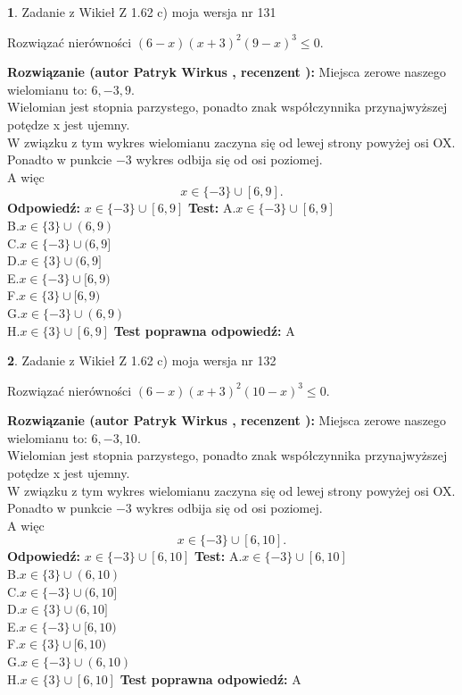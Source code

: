 \documentclass[12pt, a4paper]{article}
\theoremstyle{definition} %
\newtheorem{zad}{}
\newcommand{\zadStart}[1]{\begin{zad}#1\newline}
\newcommand{\zadStop}{\end{zad}}
\newcommand{\rozwStart}[2]{\noindent \textbf{Rozwiązanie (autor #1 , recenzent #2): }\newline}
\newcommand{\rozwStop}{\newline}
\newcommand{\odpStart}{\noindent \textbf{Odpowiedź:}\newline}
\newcommand{\odpStop}{\newline}
\newcommand{\testStart}{\noindent \textbf{Test:}\newline}
\newcommand{\testStop}{\newline}
\newcommand{\kluczStart}{\noindent \textbf{Test poprawna odpowiedź:}\newline}
\newcommand{\kluczStop}{\newline}
\begin{document}
\zadStart{Zadanie z Wikieł Z 1.62 c) moja wersja nr 131}

Rozwiązać nierówności $(6-x)(x+3)^{2}(9-x)^{3}\le0$.
\zadStop
\rozwStart{Patryk Wirkus}{}
Miejsca zerowe naszego wielomianu to: $6, -3, 9$.\\
Wielomian jest stopnia parzystego, ponadto znak współczynnika przy\linebreak najwyższej potędze x jest ujemny.\\ W związku z tym wykres wielomianu zaczyna się od lewej strony powyżej osi OX.\\
Ponadto w punkcie $-3$ wykres odbija się od osi poziomej.\\
A więc $$x \in \{-3\} \cup [6,9].$$
\rozwStop
\odpStart
$x \in \{-3\} \cup [6,9]$
\odpStop
\testStart
A.$x \in \{-3\} \cup [6,9]$\\
B.$x \in \{3\} \cup (6,9)$\\
C.$x \in \{-3\} \cup (6,9]$\\
D.$x \in \{3\} \cup (6,9]$\\
E.$x \in \{-3\} \cup [6,9)$\\
F.$x \in \{3\} \cup [6,9)$\\
G.$x \in \{-3\} \cup (6,9)$\\
H.$x \in \{3\} \cup [6,9]$
\testStop
\kluczStart
A
\kluczStop



\zadStart{Zadanie z Wikieł Z 1.62 c) moja wersja nr 132}

Rozwiązać nierówności $(6-x)(x+3)^{2}(10-x)^{3}\le0$.
\zadStop
\rozwStart{Patryk Wirkus}{}
Miejsca zerowe naszego wielomianu to: $6, -3, 10$.\\
Wielomian jest stopnia parzystego, ponadto znak współczynnika przy\linebreak najwyższej potędze x jest ujemny.\\ W związku z tym wykres wielomianu zaczyna się od lewej strony powyżej osi OX.\\
Ponadto w punkcie $-3$ wykres odbija się od osi poziomej.\\
A więc $$x \in \{-3\} \cup [6,10].$$
\rozwStop
\odpStart
$x \in \{-3\} \cup [6,10]$
\odpStop
\testStart
A.$x \in \{-3\} \cup [6,10]$\\
B.$x \in \{3\} \cup (6,10)$\\
C.$x \in \{-3\} \cup (6,10]$\\
D.$x \in \{3\} \cup (6,10]$\\
E.$x \in \{-3\} \cup [6,10)$\\
F.$x \in \{3\} \cup [6,10)$\\
G.$x \in \{-3\} \cup (6,10)$\\
H.$x \in \{3\} \cup [6,10]$
\testStop
\kluczStart
A
\kluczStop
\end{document}
